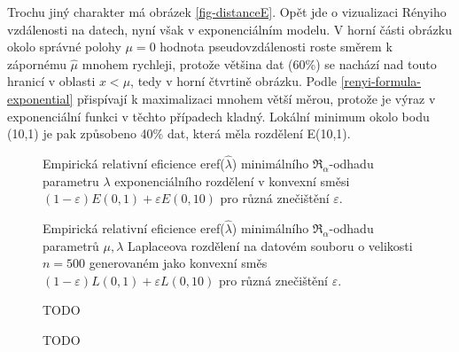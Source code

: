 Trochu jiný charakter má obrázek \ref{fig-distanceE}. Opět jde o vizualizaci Rényiho vzdálenosti na datech, nyní však v exponenciálním modelu. V horní části obrázku okolo správné polohy $\mu = 0$  hodnota pseudovzdálenosti roste směrem k zápornému $\hat{\mu}$ mnohem rychleji, protože většina dat (60\%) se nachází nad touto hranicí v oblasti $x<\mu$, tedy v horní čtvrtině obrázku. Podle \eqref{renyi-formula-exponential} přispívají k maximalizaci mnohem větší měrou, protože je výraz v exponenciální funkci v těchto případech kladný. Lokální minimum okolo bodu (10,1) je pak způsobeno 40\% dat, která měla rozdělení E(10,1).



\begin{figure}[htb]
	\begin{center}
		\caption{Empirická relativní eficience eref($\hat{\lambda}$) minimálního $\mathfrak{R}_\alpha$-odhadu parametru $\lambda$ exponenciálního rozdělení v konvexní směsi 
		$(1-\varepsilon)E(0,1) + \varepsilon E(0,10)$ pro různá znečištění $\varepsilon$.}
		\label{fig-eref-Exp-lambda}
	\end{center}
\end{figure}

\begin{figure}[htb]
	\begin{center}
		\caption{Empirická relativní eficience eref($\hat{\lambda}$) minimálního $\mathfrak{R}_\alpha$-odhadu parametrů  $\mu,\lambda$ Laplaceova rozdělení na datovém souboru o velikosti $n = 500$ generovaném	jako konvexní směs	$(1-\varepsilon)L(0,1) + \varepsilon L(0,10)$ pro různá znečištění $\varepsilon$.}
		\label{fig-eref-Laplace-lambda}
	\end{center}
\end{figure}

\begin{figure}[htb]
	\begin{center}
		\caption{ TODO }
		\label{fig-eref-Exp-mu}
	\end{center}
\end{figure}

\begin{figure}[htb]
	\begin{center}
		\caption{ TODO }
		\label{fig-eref-Laplace-mu}
	\end{center}
\end{figure}

